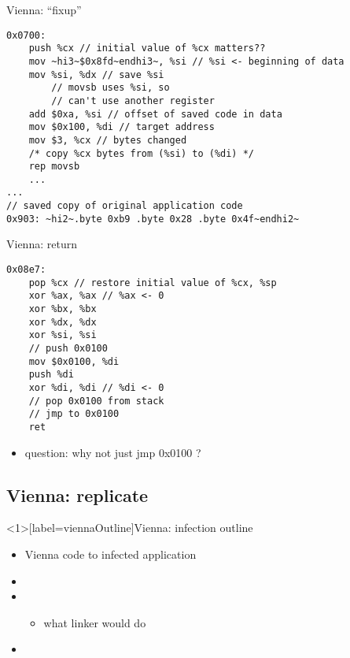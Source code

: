 \begin{frame}[fragile,label=viennaFixup]{Vienna: ``fixup''}
\begin{lstlisting}
0x0700:
    push %cx // initial value of %cx matters??
    mov ~hi3~$0x8fd~endhi3~, %si // %si <- beginning of data
    mov %si, %dx // save %si
        // movsb uses %si, so
        // can't use another register
    add $0xa, %si // offset of saved code in data
    mov $0x100, %di // target address
    mov $3, %cx // bytes changed
    /* copy %cx bytes from (%si) to (%di) */
    rep movsb 
    ...
...
// saved copy of original application code
0x903: ~hi2~.byte 0xb9 .byte 0x28 .byte 0x4f~endhi2~
\end{lstlisting}
\end{frame}

\begin{frame}[fragile,label=viennaReturn]{Vienna: return}
\lstset{language=myasm,style=small}
\begin{lstlisting}
0x08e7:
    pop %cx // restore initial value of %cx, %sp
    xor %ax, %ax // %ax <- 0
    xor %bx, %bx
    xor %dx, %dx
    xor %si, %si
    // push 0x0100
    mov $0x0100, %di
    push %di 
    xor %di, %di // %di <- 0
    // pop 0x0100 from stack
    // jmp to 0x0100
    ret 
\end{lstlisting}
\begin{itemize}
\item<1> question: why not just jmp 0x0100 ?
\end{itemize}
\end{frame}

\subsection{Vienna: replicate}

\begin{frame}<1>[label=viennaOutline]{Vienna: infection outline}
\begin{itemize}
\item Vienna  code to infected application
\vspace{.5cm}
\item {}
\item {}
    \begin{itemize}\item what linker would do\end{itemize}
\item {}
\end{itemize}
\end{frame}

